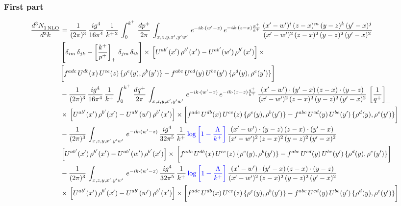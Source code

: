 \documentclass[9pt]{article}
\newcommand{\new}[1]{{\color{blue}#1}}
\numberwithin{equation}{section}
\begin{document}
\subsubsection*{First part}
\begin{align}
     \frac{d^{3}N_{1\,\rm NLO}^{\rm}}{d^{3}k}  & = \frac{1}{(2\pi)^{3}}\, \frac{ig^{4}}{16\pi^{4}}\, \frac{1}{k^{+\,2}}\,\int_{0}^{k^{+}}\, \frac{dp^{+}}{2\pi}\,\int_{x,z,y,x',y'w'}\,e^{-ik\cdot (w^\prime-z)}\,e^{-ik\cdot (z-x)\frac{p^{+}}{k^{+}}}\,\frac{(x'-w')^{i}\,(z-x)^{m}\,(y-z)^{k}\,(y'-x)^{j}}{(x'-w')^{2}\,(z-x)^{2}\,(y-z)^{2}\,(y'-x)^{2}}\,\notag \\ & \left[\delta_{im}\,\delta_{jk}-\left[\frac{k^{+}}{p^{+}}\right]_{+}\, \delta_{jm}\,\delta_{ik}\right]\times\, \left[U^{ab'}(x')\,\rho^{b'}(x')-U^{ab'}(w')\,\rho^{b'}(x')\right]\times\notag \\ & \bigg[f^{adc}\,U^{db}(x)\,U^{ce}(z)\, \{\rho^{e}(y),\rho^{b}(y')\}-f^{abc}\,U^{cd}(y)\,U^{be}(y')\, \{\rho^{d}(y),\rho^{e}(y')\}\bigg]\notag \\ & -\frac{1}{(2\pi)^{3}}\, \frac{ig^{4}}{16\pi^{4}}\, \frac{1}{k^{+}}\,\int_{0}^{k^{+}}\, \frac{dq^{+}}{2\pi}\,\int_{x,z,y,x',y'w'}\,e^{-ik\cdot (w^\prime-x)}\,e^{-ik\cdot (x-z)\frac{q^{+}}{k^{+}}}\,\frac{(x'-w')\cdot (y'-x)\,(z-x)\cdot (y-z)}{(x'-w')^{2}\,(z-x)^{2}\,(y-z)^{2}\,(y'-x)^{2}}\,\left[\frac{1}{q^{+}}\right]_{+}\notag \\ & \times\, \left[U^{ab'}(x')\,\rho^{b'}(x')-U^{ab'}(w')\,\rho^{b'}(x')\right]\times \bigg[f^{adc}\,U^{db}(x)\,U^{ce}(z)\, \{\rho^{e}(y),\rho^{b}(y')\}-f^{abc}\,U^{cd}(y)\,U^{be}(y')\, \{\rho^{d}(y),\rho^{e}(y')\}\bigg]\notag \\ & -\frac{1}{(2\pi)^{3}}\, \int_{x,z,y,x',y'w'}\,e^{-ik\cdot (w^\prime-z)}\,\frac{ig^{4}}{32\pi^{5}}\, \frac{1}{k^{+}}\,\new{\log{\left[1-\frac{\Lambda}{k^{+}}\right]}}\,\frac{(x'-w')\cdot (y-z)\,(z-x)\cdot (y'-x)}{(x'-w')^{2}\,(z-x)^{2}\,(y-z)^{2}\,(y'-x)^{2}}\,\notag \\ & \left[U^{ab'}(x')\,\rho^{b'}(x')-U^{ab'}(w')\,\rho^{b'}(x')\right]\times\, \bigg[f^{adc}\,U^{db}(x)\,U^{ce}(z)\, \{\rho^{e}(y),\rho^{b}(y')\}-f^{abc}\,U^{cd}(y)\,U^{be}(y')\, \{\rho^{d}(y),\rho^{e}(y')\}\bigg]\notag \\ &  -\frac{1}{(2\pi)^{3}}\, \int_{x,z,y,x',y'w'}\,e^{-ik\cdot (w^\prime-x)}\,\frac{ig^{4}}{32\pi^{5}}\, \frac{1}{k^{+}}\, \new{\log{\left[1-\frac{\Lambda}{k^{+}}\right]}}\,\frac{(x'-w')\cdot (y'-x)\,(z-x)\cdot (y-z)}{(x'-w')^{2}\,(z-x)^{2}\,(y-z)^{2}\,(y'-x)^{2}}\notag \\ & \times\, \left[U^{ab'}(x')\,\rho^{b'}(x')-U^{ab'}(w')\,\rho^{b'}(x')\right]\times \bigg[f^{adc}\,U^{db}(x)\,U^{ce}(z)\, \{\rho^{e}(y),\rho^{b}(y')\}-f^{abc}\,U^{cd}(y)\,U^{be}(y')\, \{\rho^{d}(y),\rho^{e}(y')\}\bigg]
\end{align}
\end{document}
